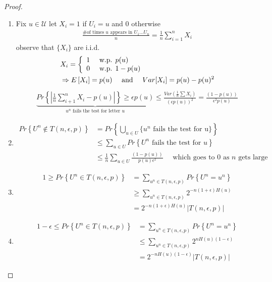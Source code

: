 \documentclass[twoside]{article}
\theoremstyle{definition} %
\renewcommand{\Pr}[1]{Pr\left\{#1\right\}}
\newcommand{\Ex}[1]{E\left[#1\right]}
\def\U{\mathcal{U}}
\begin{document}
\begin{proof}
  \begin{enumerate}
    \item
    Fix $u \in \U$ let $X_i = 1$ if $ U_i = u$ and $0$ otherwise
    \begin{align*}
      \frac{\text{\# of times } u \text{ appears in } U_1 ... U_n}{n} = \frac{1}{n} \sum_{i = 1}^n X_i
    \end{align*}
    observe that $\{ X_i \}$ are i.i.d.
    \begin{align*}
      &X_i =
      \left\{
        \begin{array}{l l}
          1 & \text{ w.p. } p(u) \\
          0 & \text{ w.p. } 1 - p(u)
        \end{array}
      \right. \\
      &\Rightarrow \Ex{X_i} = p(u) \quad \text{ and } \quad Var[X_i] = p(u) - p(u)^2 \\
    \end{align*}
    \begin{align*}
      \underbrace{
        \Pr{|\frac{1}{n} \sum_{i+1}^n X_i - p(u)|}\geq \epsilon p(u)
      }_{u^n \text{ fails the test for letter } u}
      \leq
      \frac{Var(\frac{1}{n} \sum X_i)}{(\epsilon p(u))^2}
      = \frac{(1 - p(u))}{\epsilon^2 p(u)}
    \end{align*}

    \item
    \begin{align*}
      \Pr{U^n \not \in T(n, \epsilon, p)} &= \Pr{\bigcup_{u \in U} \{u^n \text{ fails the test for u} \}} \\
      &\leq \sum_{u \in U} \Pr{U^n \text{ fails the test for } u} \\
      &\leq \frac{1}{n} \sum_{u \in U} \frac{(1 - p(u))}{p(u) \epsilon^2} \quad \text{ which goes to 0 as } n \text{ gets large}
    \end{align*}

    \item
    \begin{align*}
      1 \geq \Pr{U^n \in T(n, \epsilon, p)} &= \sum_{u^n \in T(n, \epsilon, p)} \Pr{U^n = u^n} \\
      &\geq \sum_{u^n \in T(n, \epsilon, p)} 2^{-n(1 + \epsilon) H(u)} \\
      &= 2^{-n (1 + \epsilon) H(u)} |T(n, \epsilon, p)|
    \end{align*}

    \item
    \begin{align*}
      1 - \epsilon \leq \Pr{U^n \in T(n, \epsilon, p)} &= \sum_{u^n \in T(n, \epsilon, p)} \Pr{U^n = u^n} \\
       &\leq \sum_{u^n \in T(n, \epsilon, p)} 2^{n H(u)(1-\epsilon)} \\
       &= 2^{-n H(u)(1 - \epsilon)} |T(n, \epsilon, p)|
    \end{align*}

  \end{enumerate}
\end{proof}
\end{document}
